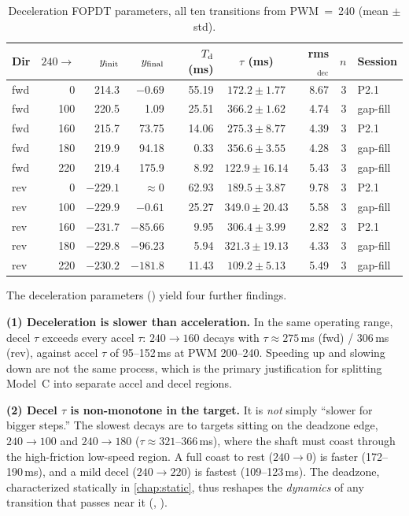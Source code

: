 \begin{table}[t]
  \centering
  \caption{Deceleration FOPDT parameters, all ten transitions from PWM~=~240 (mean $\pm$ std).}
  \label{tab:decel}
  \footnotesize
  \begin{tabular}{@{}lrrrrcrrl@{}}
    \toprule
    Dir & $240\to$ & $y_{\mathrm{init}}$ & $y_{\mathrm{final}}$ & $T_{\mathrm{d}}$ (ms) & $\tau$ (ms) & rms$_{\mathrm{dec}}$ & $n$ & Session \\
    \midrule
    fwd & 0   & 214.3   & $-0.69$  & 55.19 & $172.2 \pm 1.77$  & 8.67 & 3 & P2.1 \\
    fwd & 100 & 220.5   & 1.09     & 25.51 & $366.2 \pm 1.62$  & 4.74 & 3 & gap-fill \\
    fwd & 160 & 215.7   & 73.75    & 14.06 & $275.3 \pm 8.77$  & 4.39 & 3 & P2.1 \\
    fwd & 180 & 219.9   & 94.18    & 0.33  & $356.6 \pm 3.55$  & 4.28 & 3 & gap-fill \\
    fwd & 220 & 219.4   & 175.9    & 8.92  & $122.9 \pm 16.14$ & 5.43 & 3 & gap-fill \\
    rev & 0   & $-229.1$& ${\approx}0$ & 62.93 & $189.5 \pm 3.87$ & 9.78 & 3 & P2.1 \\
    rev & 100 & $-229.9$& $-0.61$  & 25.27 & $349.0 \pm 20.43$ & 5.58 & 3 & gap-fill \\
    rev & 160 & $-231.7$& $-85.66$ & 9.95  & $306.4 \pm 3.99$  & 2.82 & 3 & P2.1 \\
    rev & 180 & $-229.8$& $-96.23$ & 5.94  & $321.3 \pm 19.13$ & 4.33 & 3 & gap-fill \\
    rev & 220 & $-230.2$& $-181.8$ & 11.43 & $109.2 \pm 5.13$  & 5.49 & 3 & gap-fill \\
    \bottomrule
  \end{tabular}
\end{table}

The deceleration parameters () yield four further findings.

\textbf{(1) Deceleration is slower than acceleration.} In the same operating range, decel $\tau$ exceeds every accel $\tau$: $240\to160$ decays with $\tau \approx 275$\,ms (fwd) / 306\,ms (rev), against accel $\tau$ of 95--152\,ms at PWM 200--240. Speeding up and slowing down are not the same process, which is the primary justification for splitting Model~C into separate accel and decel regions.

\textbf{(2) Decel $\tau$ is non-monotone in the target.} It is \emph{not} simply ``slower for bigger steps.'' The slowest decays are to targets sitting on the deadzone edge, $240\to100$ and $240\to180$ ($\tau \approx 321$--$366$\,ms), where the shaft must coast through the high-friction low-speed region. A full coast to rest ($240\to0$) is faster (172--190\,ms), and a mild decel ($240\to220$) is fastest (109--123\,ms). The deadzone, characterized statically in \cref{chap:static}, thus reshapes the \emph{dynamics} of any transition that passes near it (, ).

